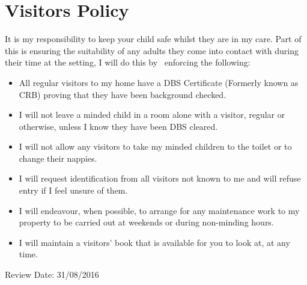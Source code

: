 

\section{Visitors Policy}

It is my responsibility to keep your child safe whilst they are in my
care. Part of this is ensuring the suitability of any adults they come
into contact with during their time at the setting, I will do this by
~enforcing the following:

\begin{itemize}
\item
  All regular visitors to my home have a DBS Certificate (Formerly
  known as CRB) proving that they have been background checked. ~
\end{itemize}

\begin{itemize}
\item
  I will not leave a minded child in a room alone with a visitor,
  regular or otherwise, unless I know they have been DBS cleared.~
\item
  I will not allow any visitors to take my minded children to the
  toilet or to change their nappies.~
\end{itemize}

\begin{itemize}
\item
  I will request identification from all visitors not known to me and
  will refuse entry if I feel unsure of them. ~
\end{itemize}

\begin{itemize}
\item
  I will endeavour, when possible, to arrange for any maintenance work
  to my property to be carried out at weekends or during non-minding
  hours. ~
\end{itemize}

\begin{itemize}
\item
  I will maintain a visitors' book that is available for you to look
  at, at any time.~
\end{itemize}

Review Date: 31/08/2016


